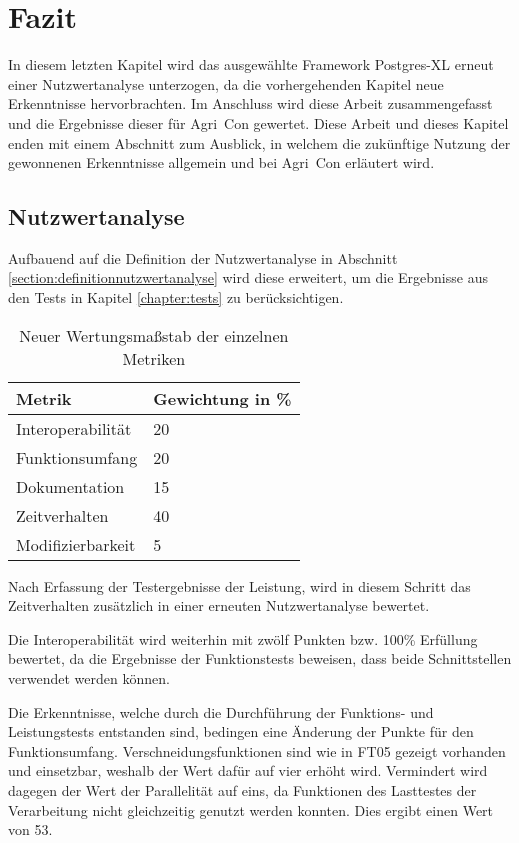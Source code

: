 \chapter{Fazit}
In diesem letzten Kapitel wird das ausgewählte Framework Postgres-XL erneut einer Nutzwertanalyse unterzogen, da die vorhergehenden Kapitel neue Erkenntnisse hervorbrachten.
Im Anschluss wird diese Arbeit zusammengefasst und die Ergebnisse dieser für Agri~Con gewertet.
Diese Arbeit und dieses Kapitel enden mit einem Abschnitt zum Ausblick, in welchem die zukünftige Nutzung der gewonnenen Erkenntnisse allgemein und bei Agri~Con erläutert wird.

\section{Nutzwertanalyse}
Aufbauend auf die Definition der Nutzwertanalyse in Abschnitt \ref{section:definitionnutzwertanalyse} wird diese erweitert, um die Ergebnisse aus den Tests in Kapitel \ref{chapter:tests} zu berücksichtigen.

\begin{table}[h!]
\centering
\begin{tabular}{l|l}
\textbf{Metrik} & \textbf{Gewichtung in \%} \\ \hline
Interoperabilität & 20 \\ \hline
Funktionsumfang & 20 \\ \hline
Dokumentation & 15 \\ \hline
Zeitverhalten & 40 \\ \hline
Modifizierbarkeit & 5
\end{tabular}
\caption{Neuer Wertungsmaßstab der einzelnen Metriken}
\label{table:Wertungsmassstab2}
\end{table}
Nach Erfassung der Testergebnisse der Leistung, wird in diesem Schritt das Zeitverhalten zusätzlich in einer erneuten Nutzwertanalyse bewertet.

Die Interoperabilität wird weiterhin mit zwölf Punkten bzw. 100\%{} Erfüllung bewertet, da die Ergebnisse der Funktionstests beweisen, dass beide Schnittstellen verwendet werden können.

Die Erkenntnisse, welche durch die Durchführung der Funktions- und Leistungstests entstanden sind, bedingen eine Änderung der Punkte für den Funktionsumfang.
Verschneidungsfunktionen sind wie in FT05 gezeigt vorhanden und einsetzbar, weshalb der Wert dafür auf vier erhöht wird.
Vermindert wird dagegen der Wert der Parallelität auf eins, da Funktionen des Lasttestes der Verarbeitung nicht gleichzeitig genutzt werden konnten.
Dies ergibt einen Wert von 53.


